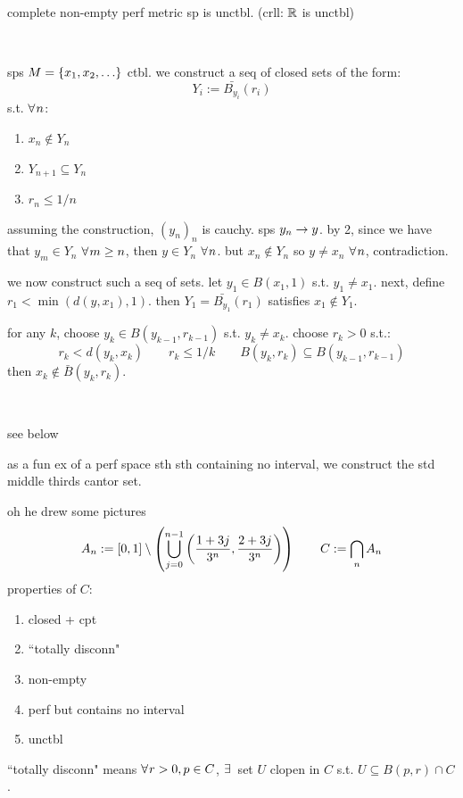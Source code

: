 \begin{thm}
    complete non-empty perf metric sp is unctbl.
	(crll: $\mathbb{R}$ is unctbl)
\end{thm} \

\begin{pf}[source=Primary Source Material]
    sps $M=\left\{{x_{1},x_{2},\dots}\right\}$ ctbl.
	we construct a seq of closed sets of the form:
	\begin{equation*}
		Y_{i}:=\bar{B_{y_{i}}}(r_{i})
	\end{equation*}
	s.t. $\fa n$:
	\begin{enumerate}
	    \item $x_{n}\notin Y_{n}$
		\item $Y_{n+1}\subseteq Y_{n}$
		\item $r_{n}\leq1/n$
	\end{enumerate}
	assuming the construction, $(y_{n})_{n}$ is cauchy. sps $y_{n}\rightarrow y$.
	by 2, since we have that $y_{m}\in Y_{n}$ $\fa m\geq n$, then
	$y\in Y_{n}$ $\fa n$.
	but $x_{n}\notin Y_{n}$ so $y\neq x_{n}$ $\fa n$, contradiction.

	we now construct such a seq of sets.
	let $y_{1}\in B(x_{1},1)$ s.t. $y_{1}\neq x_{1}$.
	next, define $r_{1}<\min(d(y,x_{1}),1)$.
	then $Y_{1}=\bar{B_{y_{1}}}(r_{1})$ satisfies $x_{1}\notin Y_{1}$.

	for any $k$, choose $y_{k}\in B(y_{k-1},r_{k-1})$ s.t. $y_{k}\neq x_{k}$.
	choose $r_{k}>0$ s.t.:
	\begin{equation*}
	    r_{k}<d(y_{k},x_{k}) \qquad
		r_{k}\leq1/k \qquad
		B(y_{k},r_{k})\subseteq B(y_{k-1},r_{k-1})
	\end{equation*}
	then $x_{k}\notin\bar{B}(y_{k},r_{k})$.
\end{pf} \

\begin{xmp}[title=Cantor Set]
	see below
\end{xmp}
as a fun ex of a perf space sth sth containing no interval,
we construct the std middle thirds cantor set.

oh he drew some pictures
\begin{equation*}
    A_{n}:=[0,1]\setminus
	\left(
	\bigcup_{j=0}^{n-1}\left(\frac{1+3j}{3^{n}},\frac{2+3j}{3^{n}}\right)
	\right)
	\qquad
	C:=\bigcap_{n}A_{n}
\end{equation*}
properties of $C$:
\begin{enumerate}
    \item closed + cpt
	\item ``totally disconn"
	\item non-empty
	\item perf but contains no interval
	\item unctbl
\end{enumerate}
``totally disconn" means $\fa r>0, p\in C$, $\ex$ set $U$ clopen in $C$ s.t.
$U\subseteq B(p,r)\cap C$.

